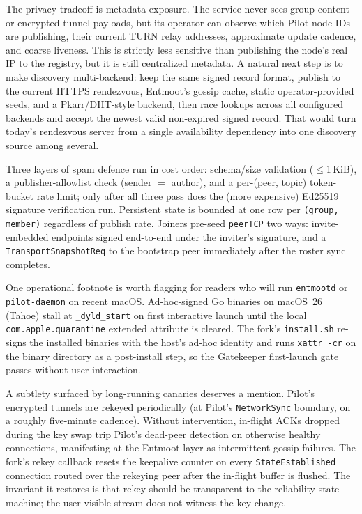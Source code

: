 \documentclass[11pt,a4paper,twocolumn]{article}
\begin{document}
The privacy tradeoff is metadata exposure. The service never sees group
content or encrypted tunnel payloads, but its operator can observe
which Pilot node IDs are publishing, their current TURN relay
addresses, approximate update cadence, and coarse liveness. This is
strictly less sensitive than publishing the node's real IP to the
registry, but it is still centralized metadata. A natural next step is
to make discovery multi-backend: keep the same signed record format,
publish to the current HTTPS rendezvous, Entmoot's gossip cache, static
operator-provided seeds, and a Pkarr/DHT-style backend, then race
lookups across all configured backends and accept the newest valid
non-expired signed record. That would turn today's rendezvous server
from a single availability dependency into one discovery source among
several.

Three layers of spam defence run in cost order: schema/size
validation ($\le$1\,KiB), a publisher-allowlist check (sender
$=$ author), and a per-(peer, topic) token-bucket rate limit;
only after all three pass does the (more expensive) Ed25519
signature verification run. Persistent state is bounded at one
row per \texttt{(group, member)} regardless of publish rate.
Joiners pre-seed \texttt{peerTCP} two ways: invite-embedded
endpoints signed end-to-end under the inviter's signature, and a
\texttt{TransportSnapshotReq} to the bootstrap peer immediately
after the roster sync completes.

One operational footnote is worth flagging for readers who will
run \texttt{entmootd} or \texttt{pilot-daemon} on recent macOS.
Ad-hoc-signed Go binaries on macOS~26 (Tahoe) stall at
\texttt{\_dyld\_start} on first interactive launch until the local
\texttt{com.apple.quarantine} extended attribute is cleared. The
fork's \texttt{install.sh} re-signs the installed binaries with
the host's ad-hoc identity and runs \texttt{xattr -cr} on the
binary directory as a post-install step, so the Gatekeeper
first-launch gate passes without user interaction.

A subtlety surfaced by long-running canaries deserves a mention.
Pilot's encrypted tunnels are rekeyed periodically (at Pilot's
\texttt{NetworkSync} boundary, on a roughly five-minute cadence).
Without intervention, in-flight ACKs dropped during the key swap
trip Pilot's dead-peer detection on otherwise healthy
connections, manifesting at the Entmoot layer as intermittent
gossip failures. The fork's rekey callback resets the keepalive
counter on every \texttt{StateEstablished} connection routed over
the rekeying peer after the in-flight buffer is flushed. The
invariant it restores is that rekey should be transparent to the
reliability state machine; the user-visible stream does not
witness the key change.
\end{document}
